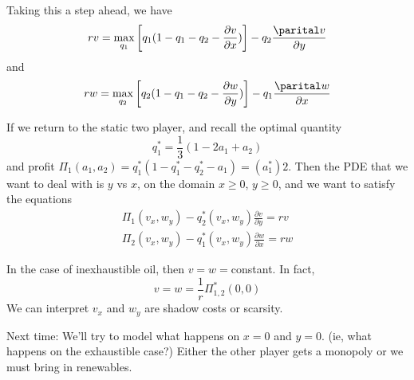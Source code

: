 Taking this a step ahead, we have
\begin{equation}
	rv = \max_{q_1} \left[ q_1(1-q_1-q_2-\frac{\partial v}{\partial x})\right]  - q_2 \frac{\parital v}{\partial y}
\end{equation}
and 
\begin{equation}
	rw = \max_{q_2} \left[ q_2(1-q_1-q_2-\frac{\partial w}{\partial y})\right]  - q_1 \frac{\parital w}{\partial x}
\end{equation}

If we return to the static two player, and recall the optimal quantity 
\begin{equation}
	q_1^* = \frac13 (1-2a_1+a_2)
\end{equation}
and profit $\Pi_1(a_1,a_2) = q_1^*(1-q_1^*-q_2^*-a_1) = (a_1^*)2$.
Then the PDE that we want to deal with is $y$ vs $x$, on the domain $x\geq 0$, $y\geq 0$, and we want to satisfy the equations
\begin{align}
	\Pi_1(v_x, w_y) - q_2^*(v_x, w_y) \frac{\partial v}{\partial y} = rv\\
	\Pi_2(v_x, w_y) - q_1^*(v_x, w_y) \frac{\partial w}{\partial x} = rw
\end{align}

In the case of inexhaustible oil, then $v=w=$constant. In fact,
\begin{equation}
	v=w=\frac{1}{r} \Pi_{1,2}^*(0,0)
\end{equation}
We can interpret $v_x$ and $w_y$ are shadow costs or scarsity.

Next time: We'll try to model what happens on $x=0$ and $y=0$. (ie, what happens on the exhaustible case?) Either the other player gets a monopoly or we must bring in renewables.









